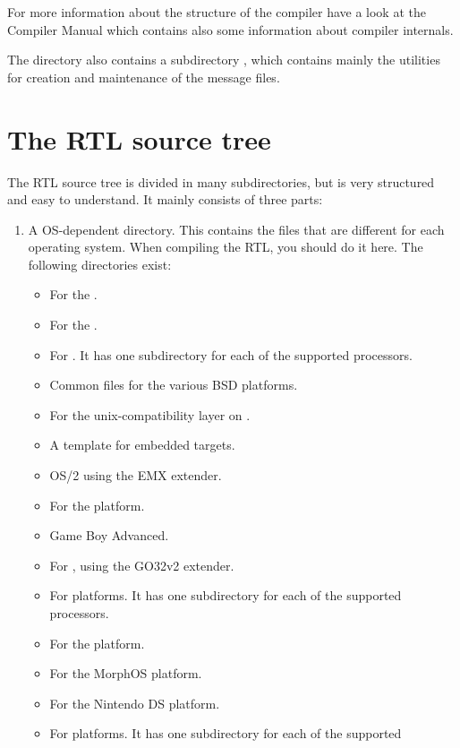 For more information about the structure of the compiler have a look at the
Compiler Manual which contains also some information about
compiler internals.

The  directory also contains a subdirectory ,
which contains mainly the utilities for creation and maintenance of the
message files.

\section{The RTL source tree}
The RTL source tree is divided in many subdirectories, but is very
structured and easy to understand. It mainly consists of three parts:

\begin{enumerate}
\item A OS-dependent directory. This contains the files that are different for
each operating system. When compiling the RTL, you should do it here. The
following directories exist:
\begin{itemize}
\item {} For the \amiga.
\item {} For the \atari.
\item {}  For \beos.
It has one subdirectory for each of the supported processors.
\item {} Common files for the various BSD platforms.
\item {} For the unix-compatibility layer on \macos.
\item {} A template for embedded targets.
\item {} OS/2 using the EMX extender.
\item {} For the \freebsd platform.
\item {} Game Boy Advanced.
\item {} For \dos, using the GO32v2 extender.
\item {} For \linux platforms. It has one subdirectory for each of the supported
processors.
\item {} For the \macos platform.
\item {} For the MorphOS platform.
\item {} For the Nintendo DS platform.
\item {} For \netbsd platforms. It has one subdirectory for each of the supported

\end{itemize}
\end{enumerate}
